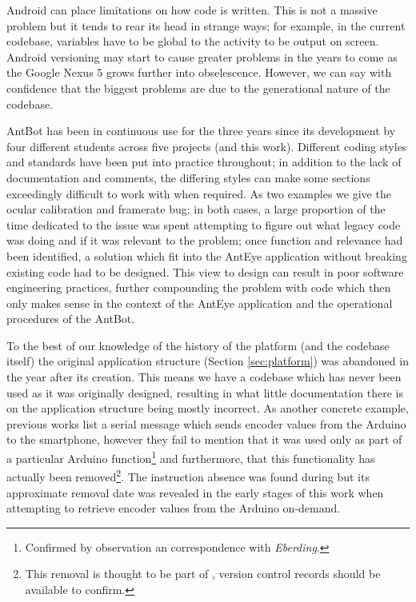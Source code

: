 \documentclass[a4paper,11pt,twoside,openright]{article}
\begin{document}
Android can place limitations on how code is written. This is not a
massive problem but it tends to rear its head in strange ways; for
example, in the current codebase, variables have to be global to the
activity to be output on screen. Android versioning may start to cause
greater problems in the years to come as the Google Nexus 5 grows
further into obselescence. However, we can say with confidence that the
biggest problems are due to the generational nature of the codebase.
\newline\par

AntBot has been in continuous use for the three years since its
development by four different students across five projects
\cite{Eberding2016,Scimeca2017,Zhang2017,Mitchell2018} (and this
work). Different coding styles and standards have been put into
practice throughout; in addition to the lack of documentation and
comments, the differing styles can make some sections exceedingly
difficult to work with when required. As two examples we give the
ocular calibration and framerate bug; in both cases, a large
proportion of the time dedicated to the issue was spent attempting to
figure out what legacy code was doing and if it was relevant to the
problem; once function and relevance had been identified, a solution
which fit into the AntEye application without breaking existing code
had to be designed. This view to design can result in poor software
engineering practices, further compounding the problem with code which
then only makes sense in the context of the AntEye application and the
operational procedures of the AntBot.
\newline\par

To the best of our knowledge of the history of the platform (and the
codebase itself) the original application structure (Section
\ref{sec:platform}) was abandoned in the year after its creation.
This means we have a codebase which has never been used as it was
originally designed, resulting in what little documentation there is
on the application structure being mostly incorrect. As another
concrete example, previous works \cite{Eberding2016, Scimeca2017,
  Zhang2017} list a serial message which sends encoder values from the
Arduino to the smartphone, however they fail to mention that it was
used only as part of a particular Arduino function\footnote{Confirmed
  by observation an correspondence with \textit{Eberding}.} and furthermore,
that this functionality has actually been removed\footnote{This removal is
thought to be part of \cite{Scimeca2017}, version control records
should be available to confirm.}. The instruction absence was found
during \cite{Mitchell2018} but its approximate removal date was
revealed in the early stages of this work when attempting to retrieve
encoder values from the Arduino on-demand.
\newline\par
\end{document}
